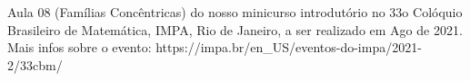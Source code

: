Aula 08 (Famílias Concêntricas) do nosso minicurso introdutório no 33o Colóquio Brasileiro de Matemática, IMPA, Rio de Janeiro, a ser realizado em Ago de 2021. Mais infos sobre o evento: https://impa.br/en_US/eventos-do-impa/2021-2/33cbm/